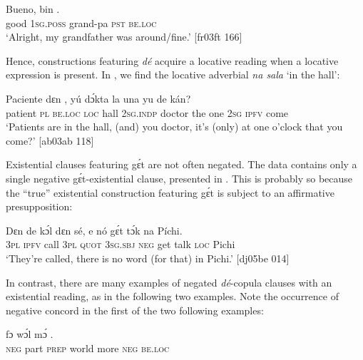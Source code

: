 \ea%
    \label{ex:key:809}
    \gll Bueno,          bin  .\\
good  \textsc{1sg.poss}  grand-pa    \textsc{pst}  \textsc{be.loc}\\

\glt ‘Alright, my grandfather was around/fine.’ [fr03ft 166]
\z

Hence, constructions featuring \textit{dé} acquire a locative reading when a locative expression is present. In , we find the locative adverbial \textit{na sala} ‘in the hall’:


\ea%
    \label{ex:key:810}
    \gll Paciente  dɛn        ,  yú    dɔ́kta  la  una
yu  de  kán?\\
patient  \textsc{pl}  \textsc{be.loc}  \textsc{loc}  hall    \textsc{2sg.indp}  doctor  the  one
\textsc{2sg}  \textsc{ipfv}  come\\

\glt ‘Patients are in the hall, (and) you doctor, it’s (only)
at one o’clock that you come?’ [ab03ab 118]
\z

Existential clauses featuring gɛ́t are not often negated. The data contains only a single negative gɛ́t-existential clause, presented in . This is probably so because the “true” existential construction featuring gɛ́t is subject to an affirmative presupposition:


\ea%
    \label{ex:key:811}
    \gll Dɛn  de  kɔ́l  dɛn  sé,    e    nó  gɛ́t tɔ́k  na  Píchi.\\
\textsc{3pl}  \textsc{ipfv}  call  \textsc{3pl}  \textsc{quot}    \textsc{3sg.sbj}  \textsc{neg}  get talk  \textsc{loc}  Pichi\\

\glt ‘They’re called, there is no word (for that) in Pichi.’ [dj05be 014]
\z

In contrast, there are many examples of negated \textit{dé}{}-copula clauses with an existential reading, as in the following two examples. Note the occurrence of negative concord in the first of the two following examples: 


\ea%
    \label{ex:key:812}
    \gll {}    fɔ  wɔ́l    mɔ́      .\\
\textsc{neg}  part  \textsc{prep}  world  more  \textsc{neg}  \textsc{be.loc}\\

